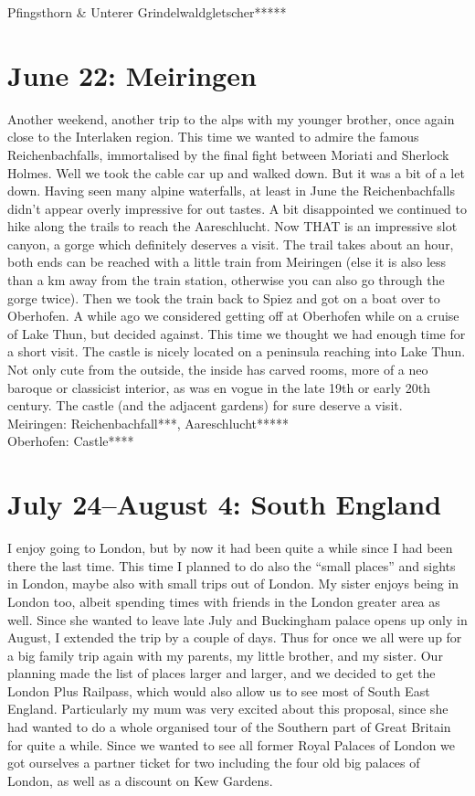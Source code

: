 Pfingsthorn \& Unterer Grindelwaldgletscher*****

\section{June 22: Meiringen}
\label{Meiringen2014}

Another weekend, another trip to the alps with my younger brother, once again close to the Interlaken region. This time we wanted to admire the famous Reichenbachfalls, immortalised by the final fight between Moriati and Sherlock Holmes. Well we took the cable car up and walked down. But it was a bit of a let down. Having seen many alpine waterfalls, at least in June the Reichenbachfalls didn't appear overly impressive for out tastes. A bit disappointed we continued to hike along the trails to reach the Aareschlucht. Now THAT is an impressive slot canyon, a gorge which definitely deserves a visit. The trail takes about an hour, both ends can be reached with a little train from Meiringen (else it is also less than a km away from the train station, otherwise you can also go through the gorge twice). Then we took the train back to Spiez and got on a boat over to Oberhofen. A while ago we considered getting off at Oberhofen while on a cruise of Lake Thun, but decided against. This time we thought we had enough time for a short visit. The castle is nicely located on a peninsula reaching into Lake Thun. Not only cute from the outside, the inside has carved rooms, more of a neo baroque or classicist interior, as was en vogue in the late 19th or early 20th century. The castle (and the adjacent gardens) for sure deserve a visit.\\

Meiringen: Reichenbachfall***, Aareschlucht*****\\
Oberhofen: Castle****

\section{July 24--August 4: South England}
\label{southengland2014}

I enjoy going to London, but by now it had been quite a while since I had been there the last time. This time I planned to do also the ``small places'' and sights in London, maybe also with small trips out of London. My sister enjoys being in London too, albeit spending times with friends in the London greater area as well. Since she wanted to leave late July and Buckingham palace opens up only in August, I extended the trip by a couple of days. Thus for once we all were up for a big family trip again with my parents, my little brother, and my sister. Our planning made the list of places larger and larger, and we decided to get the London Plus Railpass, which would also allow us to see most of South East England. Particularly my mum was very excited about this proposal, since she had wanted to do a whole organised tour of the Southern part of Great Britain for quite a while. Since we wanted to see all former Royal Palaces of London we got ourselves a partner ticket for two including the four old big palaces of London, as well as a discount on Kew Gardens.\\

